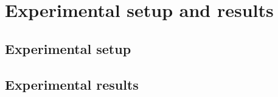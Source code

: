 \chapter{Experimental setup and results}
\label{chapter:exp_setup_results}
\minitoc


\section{Experimental setup}
\label{section:setup}

\section{Experimental results}
\label{section:results}


